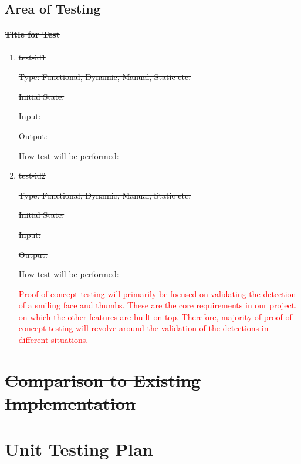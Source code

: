 \documentclass[12pt, titlepage]{article}
\begin{document}
\subsection{Area of Testing}
		
\paragraph{\sout{Title for Test}}

\begin{enumerate}

\item{\sout{test-id1}\\}

\sout{Type: Functional, Dynamic, Manual, Static etc.}
					
\sout{Initial State: }
					
\sout{Input: }
					
\sout{Output: }
					
\sout{How test will be performed: }
					
\item{\sout{test-id2}\\}

\sout{Type: Functional, Dynamic, Manual, Static etc.}
					
\sout{Initial State: }
					
\sout{Input: }
					
\sout{Output: }
					
\sout{How test will be performed: }

\textcolor{red}{Proof of concept testing will primarily be focused on validating the detection of a smiling face and thumbs. These are the core requirements in our project, on which the other features are built on top. Therefore, majority of proof of concept testing will revolve around the validation of the detections in different situations. }

\end{enumerate}

	
\section{\sout{Comparison to Existing Implementation}}
				
\section{Unit Testing Plan}
		
\end{document}

